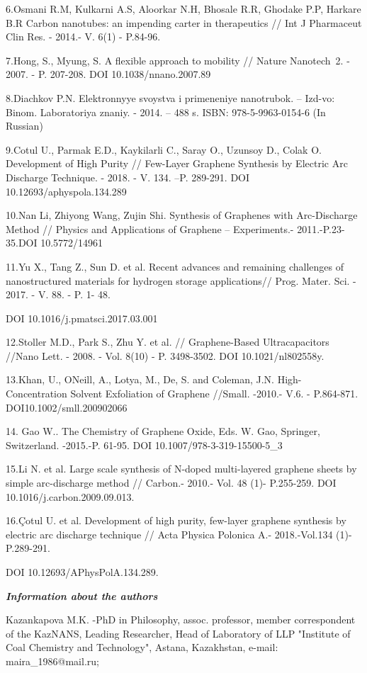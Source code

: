 6.Osmani R.M, Kulkarni A.S, Aloorkar N.H, Bhosale R.R, Ghodake P.P,
Harkare B.R Carbon nanotubes: an impending carter in therapeutics // Int
J Pharmaceut Clin Res. - 2014.- V. 6(1) - P.84-96.

7.Hong, S., Myung, S. A flexible approach to mobility // Nature
Nanotech~2. - 2007. - P. 207-208. DOI 10.1038/nnano.2007.89

8.Diachkov P.N. Elektronnyye svoystva i primeneniye nanotrubok. --
Izd-vo: Binom. Laboratoriya znaniy. - 2014. -- 488 s. ISBN:
978-5-9963-0154-6 (In Russian)

9.Cotul U., Parmak E.D., Kaykilarli C., Saray O., Uzunsoy D., Colak O.
Development of High Purity // Few-Layer Graphene Synthesis by Electric
Arc Discharge Technique. - 2018. - V. 134. --P. 289-291. DOI
10.12693/aphyspola.134.289

10.Nan Li, Zhiyong Wang, Zujin Shi. Synthesis of Graphenes with
Arc-Discharge Method // Physics and Applications of Graphene --
Experiments.- 2011.-P.23-35.DOI 10.5772/14961

11.Yu X., Tang Z., Sun D. et al. Recent advances and remaining
challenges of nanostructured materials for hydrogen storage
applications// Prog. Mater. Sci. - 2017. - V. 88. - P. 1- 48.

DOI 10.1016/j.pmatsci.2017.03.001

12.Stoller M.D., Park S., Zhu Y. et al. // Graphene-Based
Ultracapacitors //Nano Lett. - 2008. - Vol. 8(10) - P. 3498-3502. DOI
10.1021/nl802558y.

13.Khan, U., O\textquotesingle Neill, A., Lotya, M., De, S. and Coleman,
J.N. High-Concentration Solvent Exfoliation of Graphene //Small. -2010.-
V.6. - P.864-871. DOI10.1002/smll.200902066

14. Gao W.. The Chemistry of Graphene Oxide, Eds. W. Gao, Springer,
Switzerland. -2015.-P. 61-95. DOI 10.1007/978-3-319-15500-5\_3~

15.Li N. et al. Large scale synthesis of N-doped multi-layered graphene
sheets by simple arc-discharge method // Carbon.- 2010.- Vol. 48 (1)-
P.255-259. DOI 10.1016/j.carbon.2009.09.013.

16.Çotul U. et al. Development of high purity, few-layer graphene
synthesis by electric arc discharge technique // Acta Physica Polonica
A.- 2018.-Vol.134 (1)- P.289-291.

DOI 10.12693/APhysPolA.134.289.

\emph{{\bfseries Information about the authors}}

Kazankapova M.K. -PhD in Philosophy, assoc. professor, member
correspondent of the KazNANS, Leading Researcher, Head of Laboratory of
LLP "Institute of Coal Chemistry and Technology", Astana, Kazakhstan,
e-mail: maira\_1986@mail.ru;

